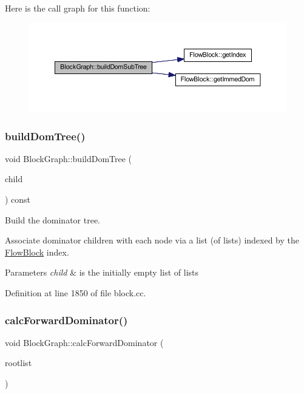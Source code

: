 Here is the call graph for this function\+:
\nopagebreak
\begin{figure}[H]
\begin{center}
\leavevmode
\includegraphics[width=350pt]{class_block_graph_a044fa551f0aae9c919884772774e11ee_cgraph}
\end{center}
\end{figure}
\mbox{\label{class_block_graph_ab762df4b2281775e41b38a38d9f5509f}} 
\subsubsection{\texorpdfstring{buildDomTree()}{buildDomTree()}}
{\footnotesize\ttfamily void Block\+Graph\+::build\+Dom\+Tree (\begin{DoxyParamCaption}\item[{vector$<$ vector$<$ \mbox{\hyperlink{class_flow_block}{Flow\+Block}} $\ast$ $>$ $>$ \&}]{child }\end{DoxyParamCaption}) const}



Build the dominator tree. 

Associate dominator children with each node via a list (of lists) indexed by the \mbox{\hyperlink{class_flow_block}{Flow\+Block}} index. 
\begin{DoxyParams}{Parameters}
{\em child} & is the initially empty list of lists \\
\hline
\end{DoxyParams}


Definition at line 1850 of file block.\+cc.

\mbox{\label{class_block_graph_a9026a993cc70a3e67c5eeb19d33a9d98}} 
\subsubsection{\texorpdfstring{calcForwardDominator()}{calcForwardDominator()}}
{\footnotesize\ttfamily void Block\+Graph\+::calc\+Forward\+Dominator (\begin{DoxyParamCaption}\item[{const vector$<$ \mbox{\hyperlink{class_flow_block}{Flow\+Block}} $\ast$ $>$ \&}]{rootlist }\end{DoxyParamCaption})}




